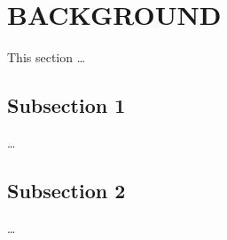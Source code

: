 

\section{BACKGROUND}

    This section \ldots

    \subsection{Subsection 1}

        \ldots

    \subsection{Subsection 2}

        \ldots
